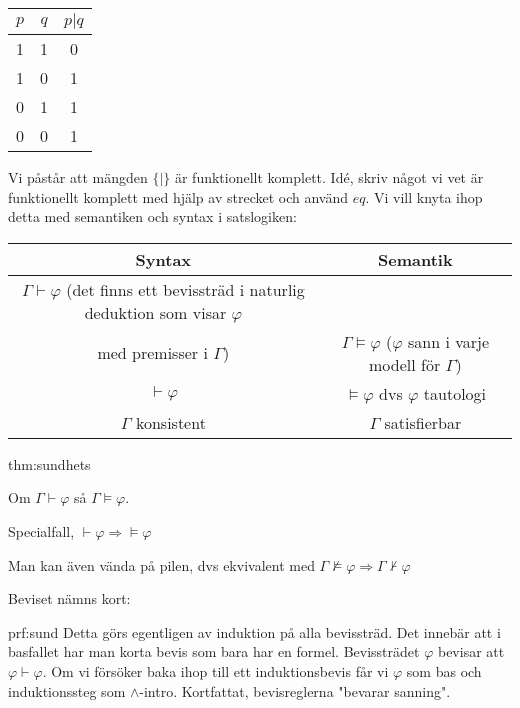 \begin{center}
  \begin{tabular}{|c|c|c|}
    \hline
    $p$&$q$&$p|q$\\
    \hline
    1&1&0\\
    \hline
    1&0&1\\
    \hline
    0&1&1\\
    \hline
    0&0&1\\
    \hline
  \end{tabular}
\end{center}\par
\noindent Vi påstår att mängden $\{|\}$ är funktionellt komplett. Idé, skriv något vi vet är funktionellt komplett med hjälp av strecket och använd $eq$.
\newpage
\noindent Vi vill knyta ihop detta med semantiken och syntax i satslogiken:

\begin{center}
  \begin{tabular}{|c|c|}
    \hline
    Syntax&Semantik\\
    \hline
    $\Gamma\vdash\varphi$ (det finns ett bevissträd i naturlig deduktion som visar $\varphi$\\ med premisser i $\Gamma$)&$\Gamma\vDash\varphi$ ($\varphi$ sann i varje modell för $\Gamma$)\\
    \hline
    $\vdash\varphi$&$\vDash\varphi$ dvs $\varphi$ tautologi\\
    \hline
    $\Gamma$ konsistent&$\Gamma$ satisfierbar\\
    \hline
  \end{tabular}
\end{center}
\par\bigskip
\begin{theo}[Sundhetssatsen]{thm:sundhets}
  \begin{center}
    Om $\Gamma\vdash\varphi$ så $\Gamma\vDash\varphi$.\par
    \noindent Specialfall, $\vdash\varphi\Rightarrow\vDash\varphi$
  \par\bigskip
  \noindent Man kan även vända på pilen, dvs ekvivalent med $\Gamma\nvDash\varphi\Rightarrow \Gamma\nvdash\varphi$
  \end{center}
\end{theo}
\par\bigskip
\noindent Beviset nämns kort:
\par\bigskip
\begin{prf}[Sundhetssatsen]{prf:sund}
  Detta görs egentligen av induktion på alla bevissträd. Det innebär att i basfallet har man korta bevis som bara har en formel. Bevissträdet $\varphi$ bevisar att $\varphi\vdash\varphi$. Om vi försöker baka ihop till ett induktionsbevis får vi $\varphi$ som bas och induktionssteg som $\wedge$-intro. Kortfattat, bevisreglerna "bevarar sanning".
\end{prf}
\par\bigskip

